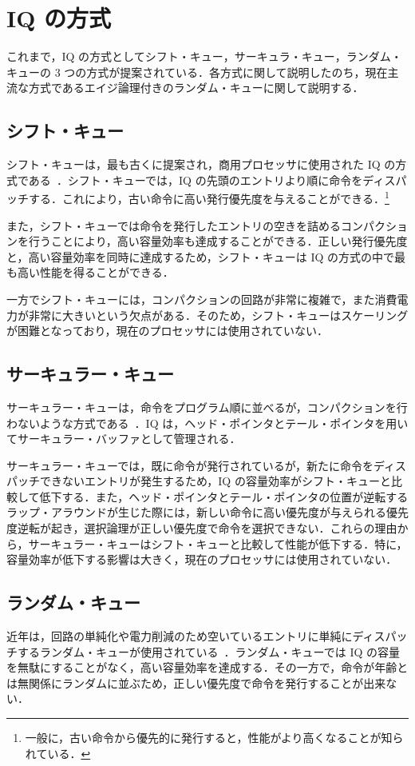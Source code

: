 \section{IQ の方式}
\label{sec:iq_scheme}
これまで，IQ の方式としてシフト・キュー，サーキュラ・キュー，ランダム・キューの 3 つの方式が提案されている．各方式に関して説明したのち，現在主流な方式であるエイジ論理付きのランダム・キューに関して説明する．

\subsection{シフト・キュー}
シフト・キューは，最も古くに提案され，商用プロセッサに使用された IQ の方式である~\cite{Farrell1998}．シフト・キューでは，IQ の先頭のエントリより順に命令をディスパッチする．これにより，古い命令に高い発行優先度を与えることができる．\footnote{一般に，古い命令から優先的に発行すると，性能がより高くなることが知られている．}

また，シフト・キューでは命令を発行したエントリの空きを詰めるコンパクションを行うことにより，高い容量効率も達成することができる．正しい発行優先度と，高い容量効率を同時に達成するため，シフト・キューは IQ の方式の中で最も高い性能を得ることができる．

一方でシフト・キューには，コンパクションの回路が非常に複雑で，また消費電力が非常に大きいという欠点がある．そのため，シフト・キューはスケーリングが困難となっており，現在のプロセッサには使用されていない．

\subsection{サーキュラー・キュー}
サーキュラー・キューは，命令をプログラム順に並べるが，コンパクションを行わないような方式である~\cite{Abella:survey2003}．IQ は，ヘッド・ポインタとテール・ポインタを用いてサーキュラー・バッファとして管理される．

サーキュラー・キューでは，既に命令が発行されているが，新たに命令をディスパッチできないエントリが発生するため，IQ の容量効率がシフト・キューと比較して低下する．また，ヘッド・ポインタとテール・ポインタの位置が逆転するラップ・アラウンドが生じた際には，新しい命令に高い優先度が与えられる優先度逆転が起き，選択論理が正しい優先度で命令を選択できない．これらの理由から，サーキュラー・キューはシフト・キューと比較して性能が低下する．特に，容量効率が低下する影響は大きく，現在のプロセッサには使用されていない．

\subsection{ランダム・キュー}
近年は，回路の単純化や電力削減のため空いているエントリに単純にディスパッチするランダム・キューが使用されている~\cite{Alpha21464, AMD-Bulldozer, IBM-Power8}．ランダム・キューでは IQ の容量を無駄にすることがなく，高い容量効率を達成する．その一方で，命令が年齢とは無関係にランダムに並ぶため，正しい優先度で命令を発行することが出来ない．


